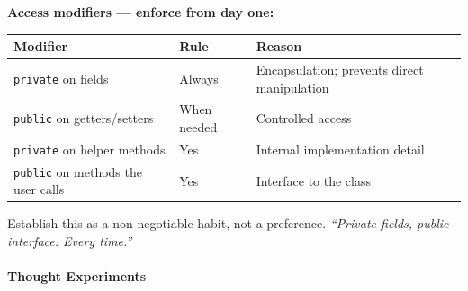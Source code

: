 \documentclass[
  justified,
  openright,
]{tufte-book}
\let\paragraph\paragraph
\let\paragraph\paragraph
\begin{document}
\textbf{Access modifiers --- enforce from day one:}

{\def\LTcaptype{none} %
\begin{longtable}[]{@{}
  >{\raggedright\arraybackslash}p{}
  >{\raggedright\arraybackslash}p{}
  >{\raggedright\arraybackslash}p{}@{}}
\toprule\noalign{}
\begin{minipage}[b]{\linewidth}\raggedright
Modifier
\end{minipage} & \begin{minipage}[b]{\linewidth}\raggedright
Rule
\end{minipage} & \begin{minipage}[b]{\linewidth}\raggedright
Reason
\end{minipage} \\
\midrule\noalign{}
\endhead
\bottomrule\noalign{}
\endlastfoot
\texttt{private} on fields & Always & Encapsulation; prevents direct
manipulation \\
\texttt{public} on getters/setters & When needed & Controlled access \\
\texttt{private} on helper methods & Yes & Internal implementation
detail \\
\texttt{public} on methods the user calls & Yes & Interface to the
class \\
\end{longtable}
}

Establish this as a non-negotiable habit, not a preference.
\emph{``Private fields, public interface. Every time.''}

\paragraph{Thought Experiments}\label{thought-experiments-9}
\end{document}
